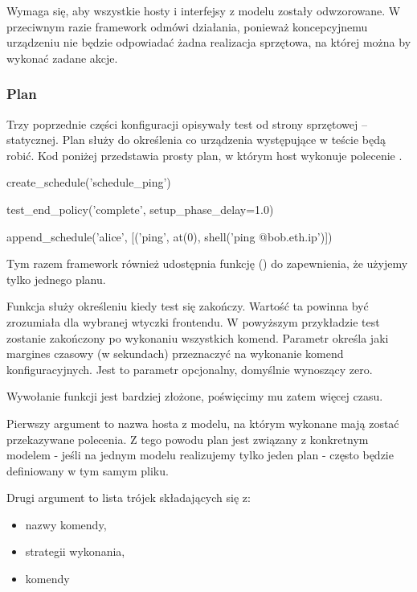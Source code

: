 \documentclass[00-praca-magisterska.tex]{subfiles}
\begin{document}
Wymaga się, aby wszystkie hosty i interfejsy z modelu zostały odwzorowane. W
przeciwnym razie framework odmówi działania, ponieważ koncepcyjnemu urządzeniu
nie będzie odpowiadać żadna realizacja sprzętowa, na której można by wykonać
zadane akcje.

\label{arete-master-config-plan}
\subsubsection{Plan}

Trzy poprzednie części konfiguracji opisywały test od strony sprzętowej --
statycznej. Plan służy do określenia co urządzenia występujące w teście będą
robić. Kod poniżej przedstawia prosty plan, w którym host wykonuje polecenie
.

\begin{pythoncode}
  create_schedule('schedule_ping')

  test_end_policy('complete', setup_phase_delay=1.0)

  append_schedule('alice', [('ping', at(0), shell('ping @{bob.eth.ip}')])
\end{pythoncode}

Tym razem framework również udostępnia funkcję () do
zapewnienia, że użyjemy tylko jednego planu.

Funkcja  służy określeniu kiedy test się zakończy.
Wartość ta powinna być zrozumiała dla wybranej wtyczki frontendu. W powyższym
przykładzie test zostanie zakończony po wykonaniu wszystkich komend. Parametr
 określa jaki margines czasowy (w sekundach)
przeznaczyć na wykonanie komend konfiguracyjnych. Jest to parametr opcjonalny,
domyślnie wynoszący zero.

Wywołanie funkcji  jest bardziej złożone, poświęcimy mu
zatem więcej czasu.

Pierwszy argument to nazwa hosta z modelu, na którym wykonane mają zostać
przekazywane polecenia. Z tego powodu plan jest związany z konkretnym modelem -
jeśli na jednym modelu realizujemy tylko jeden plan - często będzie definiowany
w tym samym pliku.

Drugi argument to lista trójek składających się z:
\begin{itemize}
\item nazwy komendy,
\item strategii wykonania,
\item komendy
\end{itemize}
\end{document}
